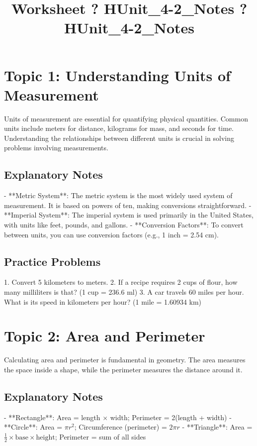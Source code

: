 \documentclass{article}
\title{Worksheet ? HUnit\_4-2\_Notes ? HUnit\_4-2\_Notes}
\author{}
\date{}
\begin{document}
\maketitle

\section*{Topic 1: Understanding Units of Measurement}
Units of measurement are essential for quantifying physical quantities. Common units include meters for distance, kilograms for mass, and seconds for time. Understanding the relationships between different units is crucial in solving problems involving measurements.

\subsection*{Explanatory Notes}
- **Metric System**: The metric system is the most widely used system of measurement. It is based on powers of ten, making conversions straightforward.
- **Imperial System**: The imperial system is used primarily in the United States, with units like feet, pounds, and gallons.
- **Conversion Factors**: To convert between units, you can use conversion factors (e.g., 1 inch = 2.54 cm).

\subsection*{Practice Problems}
1. Convert 5 kilometers to meters.
2. If a recipe requires 2 cups of flour, how many milliliters is that? (1 cup = 236.6 ml)
3. A car travels 60 miles per hour. What is its speed in kilometers per hour? (1 mile = 1.60934 km)

\section*{Topic 2: Area and Perimeter}
Calculating area and perimeter is fundamental in geometry. The area measures the space inside a shape, while the perimeter measures the distance around it.

\subsection*{Explanatory Notes}
- **Rectangle**: Area = length $\times$ width; Perimeter = 2(length + width)
- **Circle**: Area = $\pi r^2$; Circumference (perimeter) = $2\pi r$
- **Triangle**: Area = $\frac{1}{2} \times \text{base} \times \text{height}$; Perimeter = sum of all sides
\end{document}
